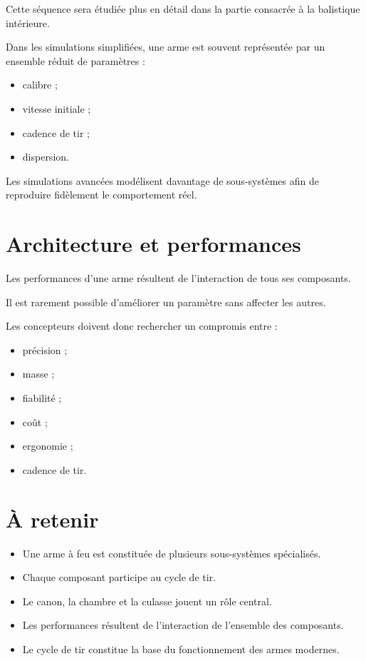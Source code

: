 Cette séquence sera étudiée plus en détail dans la partie consacrée à la
balistique intérieure.

\begin{simulation}

Dans les simulations simplifiées, une arme est souvent représentée par un
ensemble réduit de paramètres :

\begin{itemize}
    \item calibre ;
    \item vitesse initiale ;
    \item cadence de tir ;
    \item dispersion.
\end{itemize}

Les simulations avancées modélisent davantage de sous-systèmes afin de
reproduire fidèlement le comportement réel.

\end{simulation}

\section{Architecture et performances}

Les performances d'une arme résultent de l'interaction de tous ses
composants.

Il est rarement possible d'améliorer un paramètre sans affecter les autres.

Les concepteurs doivent donc rechercher un compromis entre :

\begin{itemize}
    \item précision ;
    \item masse ;
    \item fiabilité ;
    \item coût ;
    \item ergonomie ;
    \item cadence de tir.
\end{itemize}

\section{À retenir}

\begin{aretenir}

\begin{itemize}
    \item Une arme à feu est constituée de plusieurs sous-systèmes
    spécialisés.
    \item Chaque composant participe au cycle de tir.
    \item Le canon, la chambre et la culasse jouent un rôle central.
    \item Les performances résultent de l'interaction de l'ensemble des
    composants.
    \item Le cycle de tir constitue la base du fonctionnement des armes
    modernes.
\end{itemize}

\end{aretenir}
